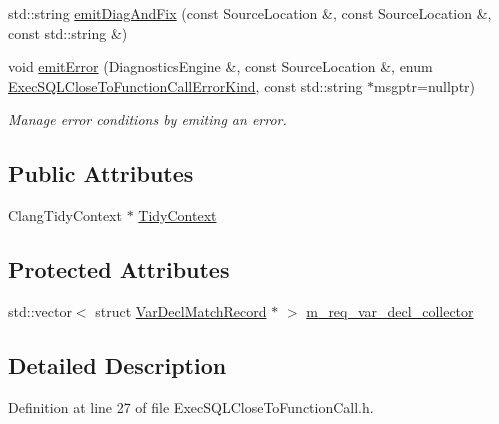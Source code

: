 \begin{DoxyCompactItemize}
std\+::string \hyperlink{classclang_1_1tidy_1_1pagesjaunes_1_1_exec_s_q_l_close_to_function_call_a9a58f75cf980f02ab9f29ac4796e3913}{emit\+Diag\+And\+Fix} (const Source\+Location \&, const Source\+Location \&, const std\+::string \&)
\item 
void \hyperlink{classclang_1_1tidy_1_1pagesjaunes_1_1_exec_s_q_l_close_to_function_call_a6cd603a678f16ede06a04049889bcf2a}{emit\+Error} (Diagnostics\+Engine \&, const Source\+Location \&, enum \hyperlink{classclang_1_1tidy_1_1pagesjaunes_1_1_exec_s_q_l_close_to_function_call_a4f10e8e9403eb403c7171a28d04288ae}{Exec\+S\+Q\+L\+Close\+To\+Function\+Call\+Error\+Kind}, const std\+::string $\ast$msgptr=nullptr)
\begin{DoxyCompactList}\small\item\em Manage error conditions by emiting an error. \end{DoxyCompactList}\end{DoxyCompactItemize}
\subsection*{Public Attributes}
\begin{DoxyCompactItemize}
\item 
Clang\+Tidy\+Context $\ast$ \hyperlink{classclang_1_1tidy_1_1pagesjaunes_1_1_exec_s_q_l_close_to_function_call_a4acea37436fdea6f4b1e1a8d55cdf7f2}{Tidy\+Context}
\end{DoxyCompactItemize}
\subsection*{Protected Attributes}
\begin{DoxyCompactItemize}
\item 
std\+::vector$<$ struct \hyperlink{structclang_1_1tidy_1_1pagesjaunes_1_1_exec_s_q_l_close_to_function_call_1_1_var_decl_match_record}{Var\+Decl\+Match\+Record} $\ast$ $>$ \hyperlink{classclang_1_1tidy_1_1pagesjaunes_1_1_exec_s_q_l_close_to_function_call_a20555e60ed6b6a5b811dc876f2e9b20f}{m\+\_\+req\+\_\+var\+\_\+decl\+\_\+collector}
\end{DoxyCompactItemize}


\subsection{Detailed Description}


Definition at line 27 of file Exec\+S\+Q\+L\+Close\+To\+Function\+Call.\+h.



